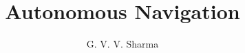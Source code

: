 \documentclass[journal,12pt,twocolumn]{IEEEtran}
\begin{document}
\makeatletter
{}
\makeatother

\let\StandardTheFigure\thefigure
\let\vec\mathbf
\let\j\jmath
\renewcommand{\thefigure}{\theproblem}



\def\putbox#1#2#3{\makebox[0in][l]{\makebox[#1][l]{}\raisebox{\baselineskip}[0in][0in]{\raisebox{#2}[0in][0in]{#3}}}}
     \def\rightbox#1{\makebox[0in][r]{#1}}
     \def\centbox#1{\makebox[0in]{#1}}
     \def\topbox#1{\raisebox{-\baselineskip}[0in][0in]{#1}}
     \def\midbox#1{\raisebox{-0.5\baselineskip}[0in][0in]{#1}}

\vspace{3cm}

\title{
	Autonomous Navigation
}


%
%
%

\author{
	G. V. V. Sharma
}
% 
%
\end{document}
